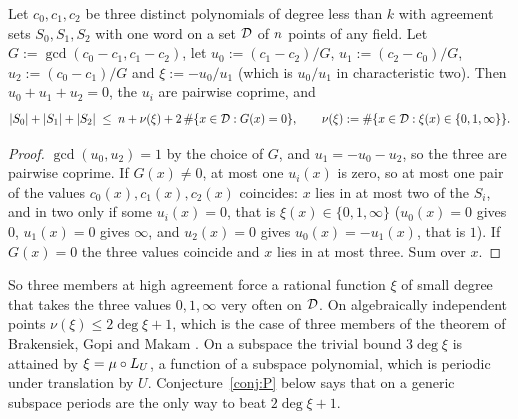\begin{proposition}\label{prop:three}
Let $c_0,c_1,c_2$ be three distinct polynomials of degree less than $k$ with agreement sets $S_0,S_1,S_2$ with one word on a set $\mathcal{D}$ of $n$ points of any field. Let $G:=\gcd(c_0-c_1,c_1-c_2)$, let $u_0:=(c_1-c_2)/G$, $u_1:=(c_2-c_0)/G$, $u_2:=(c_0-c_1)/G$ and $\xi:=-u_0/u_1$ (which is $u_0/u_1$ in characteristic two). Then $u_0+u_1+u_2=0$, the $u_i$ are pairwise coprime, and
\[
|S_0|+|S_1|+|S_2|\;\le\;n+\nu(\xi)+2\,\#\{x\in\mathcal{D}:G(x)=0\},\qquad \nu(\xi):=\#\{x\in\mathcal{D}:\xi(x)\in\{0,1,\infty\}\}.
\]
\end{proposition}
\begin{proof}
$\gcd(u_0,u_2)=1$ by the choice of $G$, and $u_1=-u_0-u_2$, so the three are pairwise coprime. If $G(x)\ne0$, at most one $u_i(x)$ is zero, so at most one pair of the values $c_0(x),c_1(x),c_2(x)$ coincides: $x$ lies in at most two of the $S_i$, and in two only if some $u_i(x)=0$, that is $\xi(x)\in\{0,1,\infty\}$ ($u_0(x)=0$ gives $0$, $u_1(x)=0$ gives $\infty$, and $u_2(x)=0$ gives $u_0(x)=-u_1(x)$, that is $1$). If $G(x)=0$ the three values coincide and $x$ lies in at most three. Sum over $x$.
\end{proof}

So three members at high agreement force a rational function $\xi$ of small degree that takes the three values $0,1,\infty$ very often on $\mathcal{D}$. On algebraically independent points $\nu(\xi)\le2\deg\xi+1$, which is the case of three members of the theorem of Brakensiek, Gopi and Makam \cite{BGM}. On a subspace the trivial bound $3\deg\xi$ is attained by $\xi=\mu\circ L_U$, a function of a subspace polynomial, which is periodic under translation by $U$. Conjecture~\ref{conj:P} below says that on a generic subspace periods are the only way to beat $2\deg\xi+1$.

